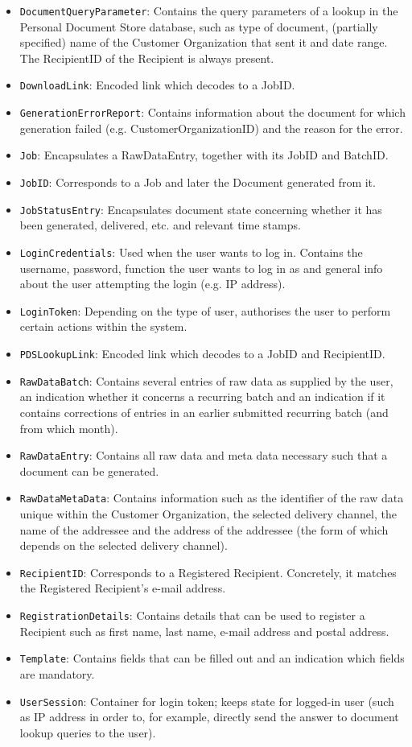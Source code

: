 \begin{itemize}
	\item \texttt{DocumentQueryParameter}: Contains the query parameters of a lookup in the Personal Document Store database, such as type of document, (partially specified) name of the Customer Organization that sent it and date range. The RecipientID of the Recipient is always present.
	\item \texttt{DownloadLink}: Encoded link which decodes to a JobID.
	\item \texttt{GenerationErrorReport}: Contains information about the document for which generation failed (e.g. CustomerOrganizationID) and the reason for the error.
	\item \texttt{Job}: Encapsulates a RawDataEntry, together with its JobID and BatchID.
	\item \texttt{JobID}: Corresponds to a Job and later the Document generated from it.
	\item \texttt{JobStatusEntry}: Encapsulates document state concerning whether it has been generated, delivered, etc. and relevant time stamps.
    \item \texttt{LoginCredentials}: Used when the user wants to log in. Contains the username, password, function the user wants to log in as and general info about the user attempting the login (e.g. IP address).
    \item \texttt{LoginToken}: Depending on the type of user, authorises the user to perform certain actions within the system.
    \item \texttt{PDSLookupLink}: Encoded link which decodes to a JobID and RecipientID.
    \item \texttt{RawDataBatch}: Contains several entries of raw data as supplied by the user, an indication whether it concerns a recurring batch and an indication if it contains corrections of entries in an earlier submitted recurring batch (and from which month). 
    \item \texttt{RawDataEntry}: Contains all raw data and meta data necessary such that a document can be generated.
    \item \texttt{RawDataMetaData}: Contains information such as the identifier of the raw data unique within the Customer Organization, the selected delivery channel, the name of the addressee and the address of the addressee (the form of which depends on the selected delivery channel).
    \item \texttt{RecipientID}: Corresponds to a Registered Recipient. Concretely, it matches the Registered Recipient's e-mail address.
    \item \texttt{RegistrationDetails}: Contains details that can be used to register a Recipient such as first name, last name, e-mail address and postal address.
    \item \texttt{Template}: Contains fields that can be filled out and an indication which fields are mandatory.
    \item \texttt{UserSession}: Container for login token; keeps state for logged-in user (such as IP address in order to, for example, directly send the answer to document lookup queries to the user).
\end{itemize}